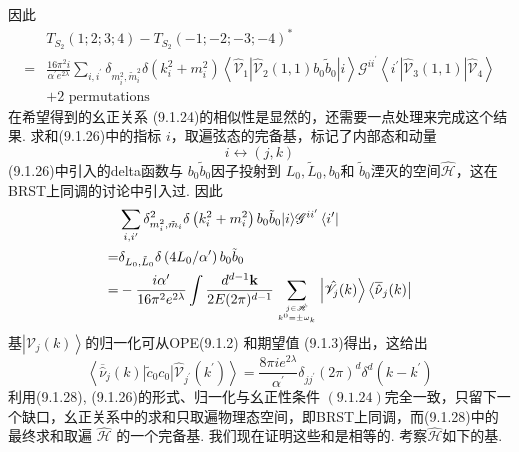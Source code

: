 因此
\begin{equation}
	\begin{aligned}
		&T_{S_{2}}(1 ; 2 ; 3 ; 4)-T_{S_{2}}(-1 ;-2 ;-3 ;-4)^{*} \\
		=&\frac{16 \pi^{2} i}{\alpha^{\prime} e^{2 \lambda}} \sum_{i, i^{\prime}} \delta_{m_{i}^{2}, \tilde{m}_{i}^{2}} \delta\left(k_{i}^{2}+m_{i}^{2}\right)\left\langle\hat{\mathscr{V}}_{1}\left|\hat{\mathscr{V}}_{2}(1,1) b_{0} \tilde{b}_{0}\right| i\right\rangle \mathscr{G}^{i i^{\prime}}\left\langle i^{\prime}\left|\hat{\mathscr{V}}_{3}(1,1)\right| \hat{\mathscr{V}}_{4}\right\rangle \\
			&+2 \text { permutations }
	\end{aligned}
\end{equation}
在希望得到的幺正关系 (9.1.24)的相似性是显然的，还需要一点处理来完成这个结果. 求和(9.1.26)中的指标 $i$，取遍弦态的完备基，标记了内部态和动量
\begin{equation}
	i \leftrightarrow(j, k)
\end{equation}
(9.1.26)中引入的delta函数与 $b_{0} \tilde{b}_{0}$因子投射到 $L_{0}, \tilde{L}_{0}, b_{0}$和 $\tilde{b}_{0}$湮灭的空间$\hat{\mathscr{H}}$，这在BRST上同调的讨论中引入过. 因此
\begin{equation}
	\begin{aligned}
		&\sum_{i, i^{\prime}} \delta_{m_{i}^{2}, \tilde{m}_{i}}^{2} \delta\left(k_{i}^{2}+m_{i}^{2}\right) b_{0} \tilde{b}_{0}|i\rangle \mathscr{G}^{i i^{\prime}}\left\langle i^{\prime}\right| \\
		=&\delta_{L_{0}, \tilde{L}_{0}} \delta\left(4 L_{0} / \alpha^{\prime}\right) b_{0} \tilde{b}_{0} \\
		=&-\frac{i \alpha^{\prime}}{16 \pi^{2} e^{2 \lambda}} \int \frac{d^{d-1} \mathbf{k}}{2 E(2 \pi)^{d-1}} \sum_{j \in \dot{\mathscr{H}} \atop k^{0}=\pm \omega_{k}}\left|\hat{\mathscr{V}}_{j}(k)\right\rangle\left\langle\overline{\hat{\nu}}_{j}(k)\right|
	\end{aligned}
\end{equation}
基$\left|\mathscr{V}_{j}(k)\right\rangle$的归一化可从OPE(9.1.2) 和期望值 (9.1.3)得出，这给出
\begin{equation}
	\left\langle\overline{\hat{\nu}}_{j}(k)\left|\tilde{c}_{0} c_{0}\right| \hat{\mathscr{V}}_{j^{\prime}}\left(k^{\prime}\right)\right\rangle=\frac{8 \pi i e^{2 \lambda}}{\alpha^{\prime}} \delta_{j j^{\prime}}(2 \pi)^{d} \delta^{d}\left(k-k^{\prime}\right)
\end{equation}
利用(9.1.28), (9.1.26)的形式、归一化与幺正性条件 $(9.1 .24)$完全一致，只留下一个缺口，幺正关系中的求和只取遍物理态空间，即BRST上同调，而(9.1.28)中的最终求和取遍 $\hat{\mathscr{H}} $ 的一个完备基. 我们现在证明这些和是相等的. 考察$\hat{\mathscr{H}}$如下的基. 
